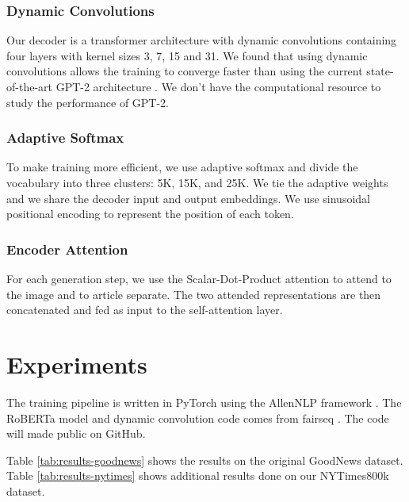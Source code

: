 \documentclass[10pt,twocolumn,letterpaper]{article}
\begin{document}
\subsubsection{Dynamic Convolutions}

Our decoder is a transformer architecture with dynamic convolutions
\cite{Wu2018PayLA} containing four layers with kernel sizes 3, 7, 15 and 31. We
found that using dynamic convolutions allows the training to converge faster
than using the current state-of-the-art GPT-2 architecture
\cite{Radford2019LanguageMA}. We don't have the computational resource to study
the performance of GPT-2.

\subsubsection{Adaptive Softmax}

To make training more efficient, we use adaptive softmax
\cite{Grave2016EfficientSA} and divide the vocabulary into three clusters: 5K,
15K, and 25K. We tie the adaptive weights and we share the decoder input and
output embeddings. We use sinusoidal positional encoding
\cite{Vaswani2017AttentionIA} to represent the position of each token.

\subsubsection{Encoder Attention}

For each generation step, we use the Scalar-Dot-Product attention
\cite{Vaswani2017AttentionIA} to attend to the image and to article separate.
The two attended representations are then concatenated and fed as input to
the self-attention layer.






\section{Experiments}

The training pipeline is written in PyTorch \cite{Paszke2017Automatic} using
the AllenNLP framework \cite{Gardner2017AllenNLP}. The RoBERTa model and
dynamic convolution code comes from fairseq \cite{Ott2019Fairseq}. The code
will made public on GitHub.

Table \ref{tab:results-goodnews} shows the results on the original GoodNews
dataset. Table \ref{tab:results-nytimes} shows additional results done on
our NYTimes800k dataset.
\end{document}
